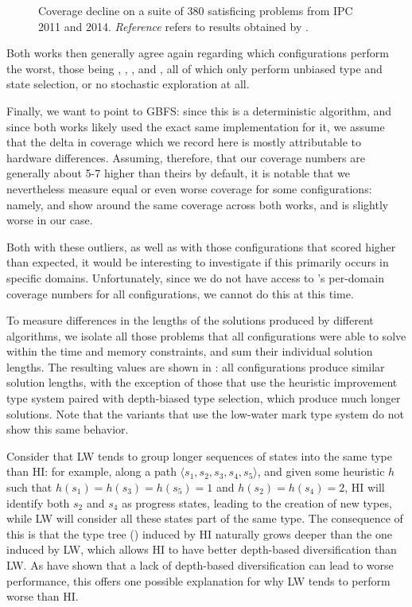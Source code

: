 \begin{figure}[{{TBLPOS}}]
    \centering
    
    \caption{Coverage decline on a suite of 380 satisficing problems from IPC 2011 and 2014. \textit{Reference} refers to results obtained by .}
    \label{fig:repltrend}
\end{figure}

Both works then generally agree again regarding which configurations perform the worst, those being \lwUu, \hiUu, \hgUu, and \gbfs, all of which only perform unbiased type and state selection, or no stochastic exploration at all.

Finally, we want to point to GBFS: since this is a deterministic algorithm, and since both works likely used the exact same implementation for it, we assume that the delta in coverage which we record here is mostly attributable to hardware differences. Assuming, therefore, that our coverage numbers are generally about 5-7 higher than theirs by default, it is notable that we nevertheless measure equal or even worse coverage for some configurations: namely, \hgHu and \hiUu show around the same coverage across both works, and \hgUu is slightly worse in our case.

Both with these outliers, as well as with those configurations that scored higher than expected, it would be interesting to investigate if this primarily occurs in specific domains. Unfortunately, since we do not have access to 's per-domain coverage numbers for all configurations, we cannot do this at this time.

To measure differences in the lengths of the solutions produced by different algorithms, we isolate all those problems that all configurations were able to solve within the time and memory constraints, and sum their individual solution lengths. The resulting values are shown in : all configurations produce similar solution lengths, with the exception of those that use the heuristic improvement type system paired with depth-biased type selection, which produce much longer solutions. Note that the variants that use the low-water mark type system do not show this same behavior.

Consider that LW tends to group longer sequences of states into the same type than HI: for example, along a path $\langle s_1,s_2,s_3,s_4,s_5\rangle$, and given some heuristic $h$ such that $h(s_1)=h(s_3)=h(s_5)=1$ and $h(s_2)=h(s_4)=2$, HI will identify both $s_2$ and $s_4$ as progress states, leading to the creation of new types, while LW will consider all these states part of the same type. The consequence of this is that the type tree () induced by HI naturally grows deeper than the one induced by LW, which allows HI to have better depth-based diversification than LW. As  have shown that a lack of depth-based diversification can lead to worse performance, this offers one possible explanation for why LW tends to perform worse than HI.

